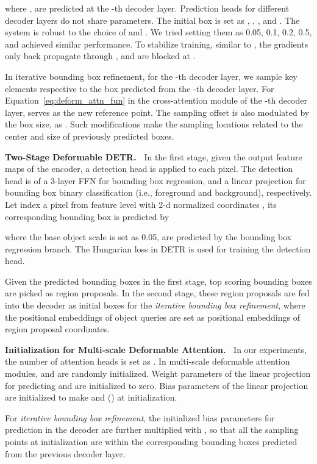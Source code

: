 \documentclass{article}
\begin{document}
where ,  are predicted at the -th decoder layer. Prediction heads for different decoder layers do not share parameters. The initial box is set as , , , and . The system is robust to the choice of  and . We tried setting them as 0.05, 0.1, 0.2, 0.5, and achieved similar performance. To stabilize training, similar to \citet{teed2020raft}, the gradients only back propagate through , and are blocked at .

In iterative bounding box refinement, for the -th decoder layer, we sample key elements respective to the box  predicted from the -th decoder layer. For Equation~\ref{eq:deform_attn_fun} in the cross-attention module of the -th decoder layer,  serves as the new reference point. The sampling offset  is also modulated by the box size, as .
Such modifications make the sampling locations related to the center and size of previously predicted boxes.

\textbf{Two-Stage Deformable DETR.~}
In the first stage, given the output feature maps of the encoder, a detection head is applied to each pixel. 
The detection head is of a 3-layer FFN for bounding box regression, and a linear projection for bounding box binary classification (i.e., foreground and background), respectively.
Let  index a pixel from feature level  with 2-d normalized coordinates , its corresponding bounding box is predicted by

where the base object scale  is set as 0.05,  are predicted by the bounding box regression branch. The Hungarian loss in DETR is used for training the detection head.

Given the predicted bounding boxes in the first stage, top scoring bounding boxes are picked as region proposals. In the second stage, these region proposals are fed into the decoder as initial boxes for the \textit{iterative bounding box refinement}, where the positional embeddings of object queries are set as positional embeddings of region proposal coordinates.


\textbf{Initialization for Multi-scale Deformable Attention.~}
In our experiments, the number of attention heads is set as .
In multi-scale deformable attention modules,  and  are randomly initialized.
Weight parameters of the linear projection for predicting  and  are initialized to zero. 
Bias parameters of the linear projection are initialized to make  and  () at initialization.

For \emph{iterative bounding box refinement}, the initialized bias parameters for  prediction in the decoder are further multiplied with , so that all the sampling points at initialization are within the corresponding bounding boxes predicted from the previous decoder layer.
\end{document}
